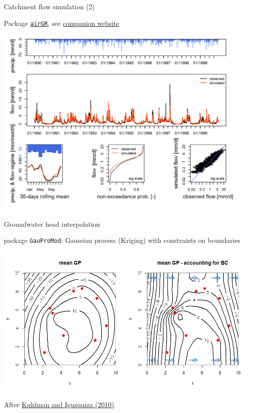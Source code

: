 \documentclass[9pt,ignorenonframetext,]{beamer}
\begin{document}
\begin{frame}[fragile]{Catchment flow simulation (2)}

Package
\href{https://cran.r-project.org/web/packages/airGR/index.html}{\texttt{airGR}},
see \href{https://odelaigue.github.io/airGR/index.html}{companion
website}

\includegraphics{imgPres/airGR.png}

\end{frame}

\begin{frame}[fragile]{Groundwater head interpolation}

package \texttt{GauProMod}: Gaussian process (Kriging) with constraints
on boundaries

\includegraphics{imgPres/GP_head_interpolation.png}

After \href{https://doi.org/10.1016/j.jhydrol.2010.01.002}{Kuhlman and
Igusquiza (2010)}

\end{frame}
\end{document}
